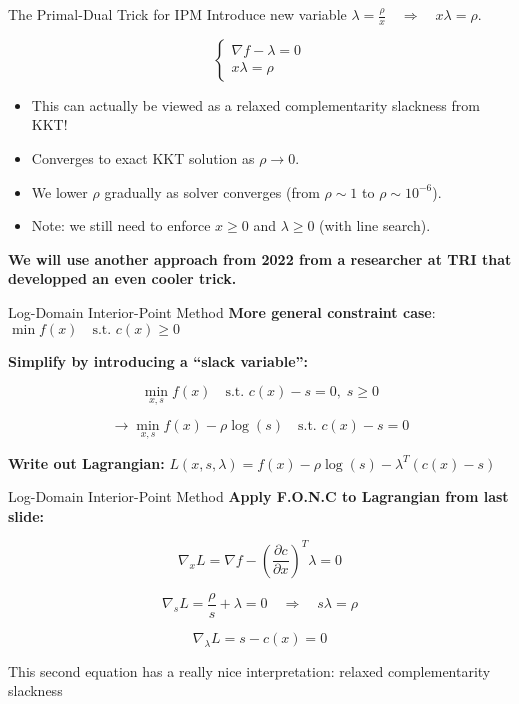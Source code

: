 \begin{frame}{The Primal-Dual Trick for IPM}
Introduce new variable $\lambda = \frac{\rho}{x} \quad \Rightarrow \quad x \lambda = \rho$.

$$
\begin{cases}
\nabla f - \lambda = 0 \\
x \lambda = \rho
\end{cases}
$$


\begin{itemize}
    \item This can actually be viewed as a relaxed complementarity slackness from KKT!
    \item Converges to exact KKT solution as $\rho \to 0$.
    \item We lower $\rho$ gradually as solver converges (from $\rho \sim 1$ to $\rho \sim 10^{-6}$).
    \item Note: we still need to enforce $x \geq 0$ and $\lambda \geq 0$ (with line search).
\end{itemize} 
\textbf{We will use another approach from 2022 from a researcher at TRI that developped an even cooler trick.}
    
\end{frame}


\begin{frame}{Log-Domain Interior-Point Method}
\textbf{More general constraint case}:   \quad \quad \quad \quad \quad  $\min f(x) \quad \text{s.t. } c(x) \geq 0$

\textbf{Simplify by introducing a “slack variable”:}

$$
\min_{x,s} f(x) \quad \text{s.t. } c(x) - s = 0, \; s \geq 0
$$

$$
\to \min_{x,s} f(x) - \rho \log(s)  \quad \text{s.t. } c(x) - s = 0
$$

\textbf{ Write out Lagrangian:} \quad \quad \quad $L(x,s,\lambda) = f(x) - \rho \log(s) - \lambda^T(c(x)-s)$  
\end{frame}


\begin{frame}{Log-Domain Interior-Point Method}
\textbf{Apply F.O.N.C to Lagrangian from last slide:}

$$
\nabla_x L = \nabla f - \left(\frac{\partial c}{\partial x}\right)^T \lambda = 0
$$

$$
\nabla_s L = \frac{\rho}{s} + \lambda = 0 \quad \Rightarrow \quad s \lambda = \rho
$$

$$
\nabla_\lambda L = s - c(x) = 0
$$

This second equation has a really nice interpretation: relaxed complementarity slackness


\end{frame}


